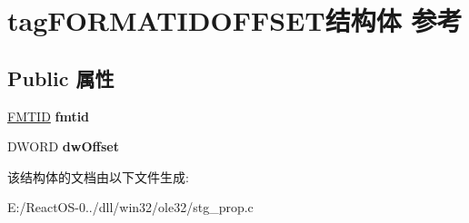 \hypertarget{structtag_f_o_r_m_a_t_i_d_o_f_f_s_e_t}{}\section{tag\+F\+O\+R\+M\+A\+T\+I\+D\+O\+F\+F\+S\+E\+T结构体 参考}
\label{structtag_f_o_r_m_a_t_i_d_o_f_f_s_e_t}
\subsection*{Public 属性}
\begin{DoxyCompactItemize}
\item 
\mbox{\label{structtag_f_o_r_m_a_t_i_d_o_f_f_s_e_t_aa2be351d8867e102ad6726f12b898695}} 
\hyperlink{interface_g_u_i_d}{F\+M\+T\+ID} {\bfseries fmtid}
\item 
\mbox{\label{structtag_f_o_r_m_a_t_i_d_o_f_f_s_e_t_a8bae34df34969d80bf8a47b7eb2c111f}} 
D\+W\+O\+RD {\bfseries dw\+Offset}
\end{DoxyCompactItemize}


该结构体的文档由以下文件生成\+:\begin{DoxyCompactItemize}
\item 
E\+:/\+React\+O\+S-\/0../dll/win32/ole32/stg\+\_\+prop.\+c\end{DoxyCompactItemize}
